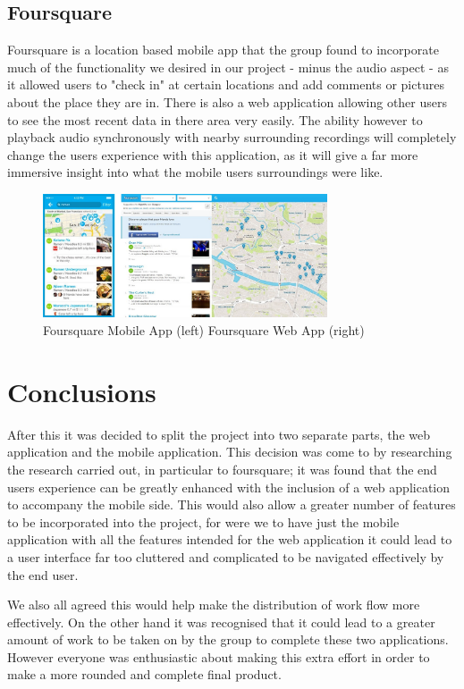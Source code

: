 \documentclass{l3proj}
\begin{document}
\subsection{Foursquare}

Foursquare is a location based mobile app that the group found to incorporate much of the functionality we desired in our project - minus the audio aspect - as it allowed users to "check in" at certain locations and add comments or pictures about the place they are in.  There is also a web application allowing other users to see the most recent data in there area very easily. The ability however to playback audio synchronously with nearby surrounding recordings will completely change the users experience with this application, as it will give a far more immersive insight into what the mobile users surroundings were like.

\begin{figure}[ht!]
  \centering
\includegraphics[width=0.75\textwidth]{images/foursquare.jpg}
\caption{Foursquare Mobile App (left) Foursquare Web App (right)}
\end{figure}

\section{Conclusions}

After this it was decided to split the project into two separate parts, the web application and the mobile application. This decision was come to by researching the research carried out, in particular to foursquare; it was found that the end users experience can be greatly enhanced with the inclusion of a web application to accompany the mobile side. This would also allow a greater number of features to be incorporated into the project, for were we to have just the mobile application with all the features intended for the web application it could lead to a user interface far too cluttered and complicated to be navigated effectively by the end user.

We also all agreed this would help make the distribution of work flow more effectively. On the other hand it was recognised that it could lead to a greater amount of work to be taken on by the group to complete these two applications. However everyone was enthusiastic about making this extra effort in order to make a more rounded and complete final product.
\end{document}
